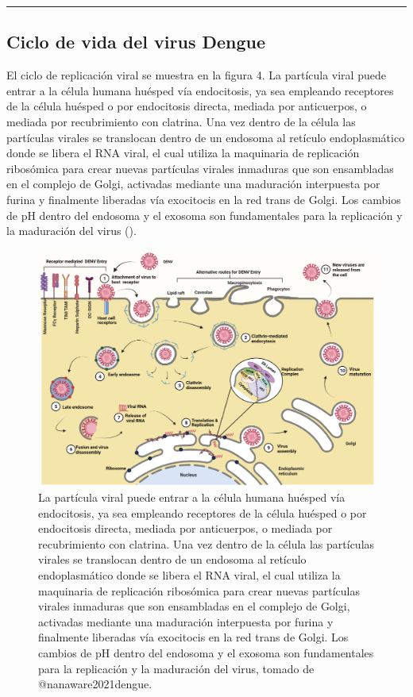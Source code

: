 \documentclass[
  12pt, krantz2,
  spanish,
]{krantz}
\begin{document}
\begin{center}\rule{0.5\linewidth}{0.5pt}\end{center}

\hypertarget{ciclo-de-vida-del-virus-dengue}{%
\subsection{Ciclo de vida del virus Dengue}\label{ciclo-de-vida-del-virus-dengue}}

El ciclo de replicación viral se muestra en la figura 4. La partícula viral puede entrar a la célula humana huésped vía endocitosis, ya sea empleando receptores de la célula huésped o por endocitosis directa, mediada por anticuerpos, o mediada por recubrimiento con clatrina. Una vez dentro de la célula las partículas virales se translocan dentro de un endosoma al retículo endoplasmático donde se libera el RNA viral, el cual utiliza la maquinaria de replicación ribosómica para crear nuevas partículas virales inmaduras que son ensambladas en el complejo de Golgi, activadas mediante una maduración interpuesta por furina y finalmente liberadas vía exocitocis en la red trans de Golgi. Los cambios de pH dentro del endosoma y el exosoma son fundamentales para la replicación y la maduración del virus (\citet{nanaware2021dengue}).

\begin{figure}
\includegraphics[width=0.8\linewidth]{figures/DenvFigura4} \caption{ La partícula viral puede entrar a la célula humana huésped vía endocitosis, ya sea empleando receptores de la célula huésped o por endocitosis directa, mediada por anticuerpos, o mediada por recubrimiento con clatrina. Una vez dentro de la célula las partículas virales se translocan dentro de un endosoma al retículo endoplasmático donde se libera el RNA viral, el cual utiliza la maquinaria de replicación ribosómica para crear nuevas partículas virales inmaduras que son ensambladas en el complejo de Golgi, activadas mediante una maduración interpuesta por furina y finalmente liberadas vía exocitocis en la red trans de Golgi. Los cambios de pH dentro del endosoma y el exosoma son fundamentales para la replicación y la maduración del virus, tomado de @nanaware2021dengue.}\label{fig:DenvCiclo}
\end{figure}
\end{document}
